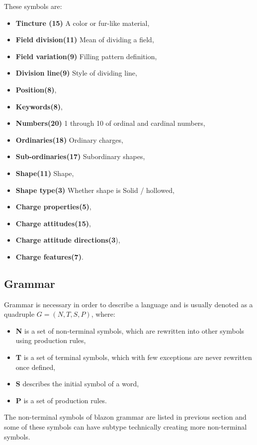 \documentclass[12pt,a4paper]{article}
\begin{document}
These symbols are:
\begin{itemize}
\setlength\itemsep{-0.5em}
\item \textbf{Tincture (15)} A color or fur-like material,
\item \textbf{Field division(11)} Mean of dividing a field,
\item \textbf{Field variation(9)} Filling pattern definition,
\item \textbf{Division line(9)} Style of dividing line,
\item \textbf{Position(8)},
\item \textbf{Keywords(8)},
\item \textbf{Numbers(20)} 1 through 10 of ordinal and cardinal numbers,
\item \textbf{Ordinaries(18)} Ordinary charges,
\item \textbf{Sub-ordinaries(17)} Subordinary shapes,
\item \textbf{Shape(11)} Shape,
\item \textbf{Shape type(3)} Whether shape is Solid / hollowed,
\item \textbf{Charge properties(5)},
\item \textbf{Charge attitudes(15)},
\item \textbf{Charge attitude directions(3}),
\item \textbf{Charge features(7)}.
\end{itemize}

\newpage
\subsection{Grammar}
Grammar is necessary in order to describe a language and is usually denoted as a quadruple $G = (N, T, S, P)$, where:
\begin{itemize}	\setlength\itemsep{-0.5em}
\item \textbf{N} is a set of non-terminal symbols, which are rewritten into other symbols using production rules,
\item \textbf{T} is a set of terminal symbols, which with few exceptions are never rewritten once defined,
\item \textbf{S} describes the initial symbol of a word,
\item \textbf{P} is a set of production rules.
\end{itemize}

The non-terminal symbols of blazon grammar are listed in previous section and some of these symbols can have subtype technically creating more non-terminal symbols.
\end{document}
